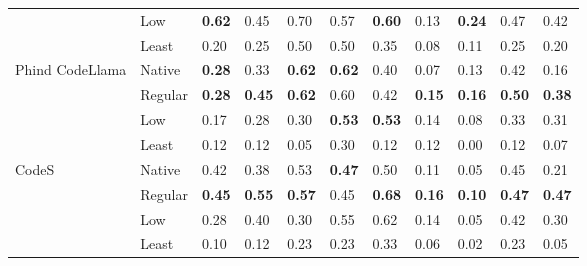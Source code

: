 \begin{tabular}{p{.9in}p{.5in}p{.3in}p{.3in}p{.3in}p{.3in}p{.3in}p{.3in}p{.3in}p{.3in}p{.3in}}
 & Low & \textbf{0.62} & 0.45 & 0.70 & 0.57 & \textbf{0.60} & 0.13 & \textbf{0.24} & 0.47 & 0.42 \\
 & Least & 0.20 & 0.25 & 0.50 & 0.50 & 0.35 & 0.08 & 0.11 & 0.25 & 0.20 \\
\cline{1-11}
\multirow[t]{4}{*}{Phind CodeLlama} & Native & \textbf{0.28} & 0.33 & \textbf{0.62} & \textbf{0.62} & 0.40 & 0.07 & 0.13 & 0.42 & 0.16 \\
 & Regular & \textbf{0.28} & \textbf{0.45} & \textbf{0.62} & 0.60 & 0.42 & \textbf{0.15} & \textbf{0.16} & \textbf{0.50} & \textbf{0.38} \\
 & Low & 0.17 & 0.28 & 0.30 & \textbf{0.53} & \textbf{0.53} & 0.14 & 0.08 & 0.33 & 0.31 \\
 & Least & 0.12 & 0.12 & 0.05 & 0.30 & 0.12 & 0.12 & 0.00 & 0.12 & 0.07 \\
\cline{1-11}
\multirow[t]{4}{*}{CodeS} & Native & 0.42 & 0.38 & 0.53 & \textbf{0.47} & 0.50 & 0.11 & 0.05 & 0.45 & 0.21 \\
 & Regular & \textbf{0.45} & \textbf{0.55} & \textbf{0.57} & 0.45 & \textbf{0.68} & \textbf{0.16} & \textbf{0.10} & \textbf{0.47} & \textbf{0.47} \\
 & Low & 0.28 & 0.40 & 0.30 & 0.55 & 0.62 & 0.14 & 0.05 & 0.42 & 0.30 \\
 & Least & 0.10 & 0.12 & 0.23 & 0.23 & 0.33 & 0.06 & 0.02 & 0.23 & 0.05 \\
\cline{1-11}
\bottomrule
\end{tabular}
